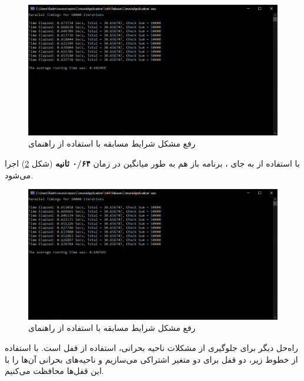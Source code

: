 \documentclass{HW}
\begin{document}
\begin{figure}[ht!]
\begin{center}
	\includegraphics[width=15cm]{images/parallel-critical}
\end{center}
\caption{رفع مشکل شرایط مسابقه با استفاده از راهنمای }
\label{fig:parallel-critical}
\end{figure}

با استفاده از  به جای ، برنامه باز هم به طور میانگین در زمان
\textbf{۰/۶۴ ثانیه}
(شکل 
\ref{fig:parallel-reduction})
اجرا می‌شود.

\begin{figure}[ht!]
\begin{center}
	\includegraphics[width=15cm]{images/parallel-reduction}
\end{center}
\caption{رفع مشکل شرایط مسابقه با استفاده از راهنمای }
\label{fig:parallel-reduction}
\end{figure}

راه‌حل دیگر برای جلوگیری از مشکلات ناحیه بحرانی، استفاده از قفل است. با استفاده از خطوط زیر، دو قفل برای دو متغیر اشتراکی می‌سازیم و ناحیه‌های بحرانی آن‌ها را با این قفل‌ها محافظت می‌کنیم.
\end{document}

